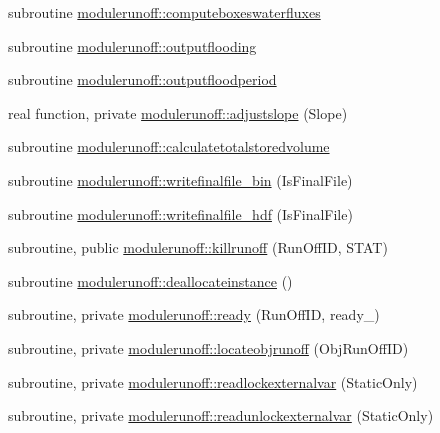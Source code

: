 \begin{DoxyCompactItemize}
\item 
subroutine \mbox{\hyperlink{namespacemodulerunoff_a88ccc0aaa3ecf729db168b684f5b4801}{modulerunoff\+::computeboxeswaterfluxes}}
\item 
subroutine \mbox{\hyperlink{namespacemodulerunoff_a61882209b1d8802763f9fb32a5f34a38}{modulerunoff\+::outputflooding}}
\item 
subroutine \mbox{\hyperlink{namespacemodulerunoff_ad52912e124d2d30970fdc6d5bd8c15cc}{modulerunoff\+::outputfloodperiod}}
\item 
real function, private \mbox{\hyperlink{namespacemodulerunoff_a5ac5c14875a2f0f2791e37f40b4321ea}{modulerunoff\+::adjustslope}} (Slope)
\item 
subroutine \mbox{\hyperlink{namespacemodulerunoff_a341a4c8ef2509bc0f144f8afd17ece22}{modulerunoff\+::calculatetotalstoredvolume}}
\item 
subroutine \mbox{\hyperlink{namespacemodulerunoff_a2f27139bf5cc235ef3e04522e63d2f5d}{modulerunoff\+::writefinalfile\+\_\+bin}} (Is\+Final\+File)
\item 
subroutine \mbox{\hyperlink{namespacemodulerunoff_af0a5f9cb46a0d94efdb301f1b582b7c4}{modulerunoff\+::writefinalfile\+\_\+hdf}} (Is\+Final\+File)
\item 
subroutine, public \mbox{\hyperlink{namespacemodulerunoff_aa17d0391187f304ab3410eb5d26a4711}{modulerunoff\+::killrunoff}} (Run\+Off\+ID, S\+T\+AT)
\item 
subroutine \mbox{\hyperlink{namespacemodulerunoff_ad9192dfb595b8f16119a042aa13d95c4}{modulerunoff\+::deallocateinstance}} ()
\item 
subroutine, private \mbox{\hyperlink{namespacemodulerunoff_aee0c5b22d517afda2e934847c9da42cb}{modulerunoff\+::ready}} (Run\+Off\+ID, ready\+\_\+)
\item 
subroutine, private \mbox{\hyperlink{namespacemodulerunoff_a573ec5acc76c43856a82166862259a60}{modulerunoff\+::locateobjrunoff}} (Obj\+Run\+Off\+ID)
\item 
subroutine, private \mbox{\hyperlink{namespacemodulerunoff_ae46242484733cacdd1c5d484f4e6eba7}{modulerunoff\+::readlockexternalvar}} (Static\+Only)
\item 
subroutine, private \mbox{\hyperlink{namespacemodulerunoff_a900316fc0130b378405b9b03d84eb9cd}{modulerunoff\+::readunlockexternalvar}} (Static\+Only)
\end{DoxyCompactItemize}
